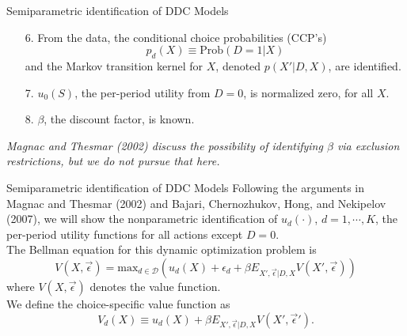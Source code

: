 \documentclass[xcolor=pdftex,dvipsnames,table,mathserif]{beamer}
\begin{document}
\begin{frame}{Semiparametric identification of DDC Models}
\begin{enumerate}
\item[6.] From the data, the \alert{conditional choice probabilities (CCP's)}  $$p_d(X) \equiv \text{Prob}(D=1|X)$$ and the Markov transition kernel for $X$, denoted $p(X'|D,X)$, are identified. 
\item[7.] $u_0(S)$, the per-period utility from $D = 0$, is normalized zero, for all $X$. \\
\item[8.] $\beta$, the discount factor, is known.
\end{enumerate}
\textit{Magnac and Thesmar (2002) discuss the possibility of identifying $\beta$ via exclusion restrictions, but we do not pursue that here.}
\end{frame}


\begin{frame}{Semiparametric identification of DDC Models}
Following the arguments in Magnac and Thesmar (2002) and Bajari, Chernozhukov, Hong, and Nekipelov (2007), we will show the nonparametric identification of $u_d(\cdot)$, $d = 1, \cdots , K$, the per-period utility functions for all actions except $D=0$.\\
\vspace{3mm}
The Bellman equation for this dynamic optimization problem is 
\begin{equation*}
V(X, \vec{\epsilon}) = \text{max}_{d \in \mathcal{D}} ( u_d(X) + \epsilon_d + \beta E_{X', \vec{\epsilon} | D, X} V(X', \vec{\epsilon}))
\end{equation*}
where $V(X, \vec{\epsilon})$ denotes the value function. \\
\vspace{0.5cm}
We define the choice-specific value function as
\begin{equation*}
V_d(X) \equiv u_d(X) + \beta E_{X', \vec{\epsilon}|D, X} V(X', \vec{\epsilon}').
\end{equation*}

\end{frame}
\end{document}
